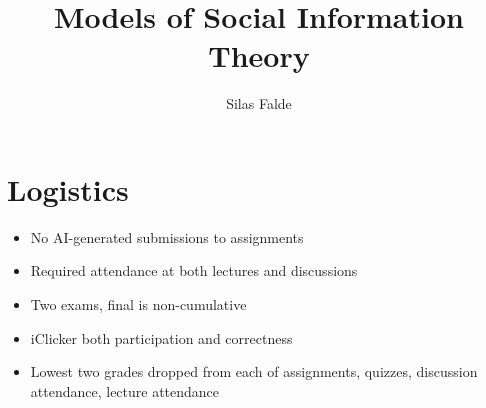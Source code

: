 \documentclass{notes}
\title{Models of Social Information Theory}
\author{Silas Falde}
\begin{document}
\maketitle

\section*{Logistics}
\begin{itemize}
    \item No AI-generated submissions to assignments
    \item Required attendance at both lectures and discussions
    \item Two exams, final is non-cumulative
    \item iClicker both participation and correctness
    \item Lowest two grades dropped from each of assignments, quizzes, discussion attendance, lecture attendance
\end{itemize}


\tableofcontents




\end{document}
